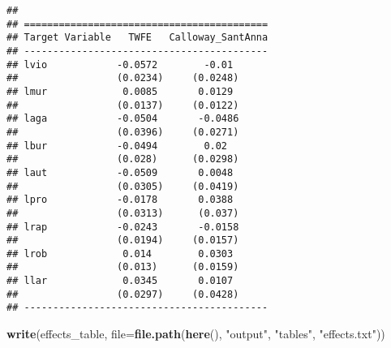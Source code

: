 \documentclass[
]{article}
\newenvironment{Shaded}{\begin{snugshade}}{\end{snugshade}}
\newcommand{\DataTypeTok}[1]{\textcolor[rgb]{0.13,0.29,0.53}{#1}}
\newcommand{\KeywordTok}[1]{\textcolor[rgb]{0.13,0.29,0.53}{\textbf{#1}}}
\newcommand{\NormalTok}[1]{#1}
\newcommand{\StringTok}[1]{\textcolor[rgb]{0.31,0.60,0.02}{#1}}
\begin{document}
\begin{verbatim}
## 
## ==========================================
## Target Variable   TWFE   Calloway_SantAnna
## ------------------------------------------
## lvio            -0.0572        -0.01      
##                 (0.0234)     (0.0248)     
## lmur             0.0085       0.0129      
##                 (0.0137)     (0.0122)     
## laga            -0.0504       -0.0486     
##                 (0.0396)     (0.0271)     
## lbur            -0.0494        0.02       
##                 (0.028)      (0.0298)     
## laut            -0.0509       0.0048      
##                 (0.0305)     (0.0419)     
## lpro            -0.0178       0.0388      
##                 (0.0313)      (0.037)     
## lrap            -0.0243       -0.0158     
##                 (0.0194)     (0.0157)     
## lrob             0.014        0.0303      
##                 (0.013)      (0.0159)     
## llar             0.0345       0.0107      
##                 (0.0297)     (0.0428)     
## ------------------------------------------
\end{verbatim}

\begin{Shaded}
\begin{Highlighting}[]
\KeywordTok{write}\NormalTok{(effects_table, }\DataTypeTok{file=}\KeywordTok{file.path}\NormalTok{(}\KeywordTok{here}\NormalTok{(), }\StringTok{"output"}\NormalTok{, }\StringTok{"tables"}\NormalTok{, }\StringTok{"effects.txt"}\NormalTok{))}
\end{Highlighting}
\end{Shaded}
\end{document}
